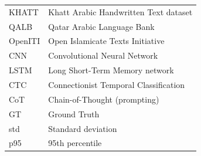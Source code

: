 \begin{longtable}{ p{1.5in} p{3.75in} }
 KHATT          & Khatt Arabic Handwritten Text dataset \\
 QALB           & Qatar Arabic Language Bank \\
 OpenITI        & Open Islamicate Texts Initiative \\
 CNN            & Convolutional Neural Network \\
 LSTM           & Long Short-Term Memory network \\
 CTC            & Connectionist Temporal Classification \\
 CoT            & Chain-of-Thought (prompting) \\
 GT             & Ground Truth \\
 std            & Standard deviation \\
 p95            & 95th percentile
\end{longtable}
